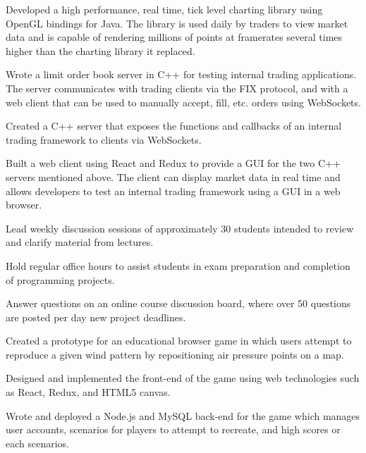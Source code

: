 \documentclass[10pt]{article}
\begin{document}

\begin{bullets}
  \item Developed a high performance, real time, tick level charting library using OpenGL bindings for Java.
        The library is used daily by traders to view market data and is capable of rendering millions of points
        at framerates several times higher than the charting library it replaced.
  \item Wrote a limit order book server in C++ for testing internal trading applications. The server communicates
        with trading clients via the FIX protocol, and with a web client that can be used to manually accept, fill,
        etc. orders using WebSockets.
  \item Created a C++ server that exposes the functions and callbacks of an internal trading framework to clients
        via WebSockets.
  \item Built a web client using React and Redux to provide a GUI for the two C++ servers mentioned above. The client
        can display market data in real time and allows developers to test an internal trading framework using a GUI
        in a web browser.
\end{bullets}

\begin{bullets}
  \item Lead weekly discussion sessions of approximately 30 students intended to review and clarify material
        from lectures.
  \item Hold regular office hours to assist students in exam preparation and completion of programming projects.
  \item Answer questions on an online course discussion board, where over 50 questions are posted per day
        new project deadlines.
\end{bullets}

\begin{bullets}
  \item Created a prototype for an educational browser game in which users attempt to reproduce a given wind
        pattern by repositioning air pressure points on a map.
  \item Designed and implemented the front-end of the game using web technologies such as React, Redux, and
        HTML5 canvas.
  \item Wrote and deployed a Node.js and MySQL back-end for the game which manages user accounts, scenarios
        for players to attempt to recreate, and high scores or each scenarios.
\end{bullets}
\end{document}
